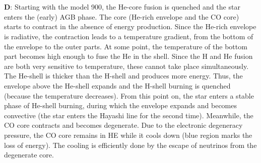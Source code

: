 \documentclass{article}
\begin{document}
\\
\\
\textbf{D}: Starting with the model 900, the He-core fusion is quenched and the star enters the (early) AGB phase. The core (He-rich envelope and the CO core) starts to contract in the absence of energy production. Since the He-rich envelope is radiative, the contraction leads to a temperature gradient, from the bottom of the envelope to the outer parts. At some point, the temperature of the bottom part becomes high enough to fuse the He in the shell. Since the H and He fusion are both very sensitive to temperature, these cannot take place simultaneously. The He-shell is thicker than the H-shell and produces more energy. Thus, the envelope above the He-shell expands and the H-shell burning is quenched (because the temperature decreases). From this point on, the star enters a stable phase of He-shell burning, during which the envelope expands and becomes convective (the star enters the Hayashi line for the second time).  Meanwhile, the CO core contracts and becomes degenerate. Due to the electronic degeneracy pressure, the CO core remains in HE while it cools down (blue region marks the loss of energy). The cooling is efficiently done by the escape of neutrinos from the degenerate core.




\end{document}
